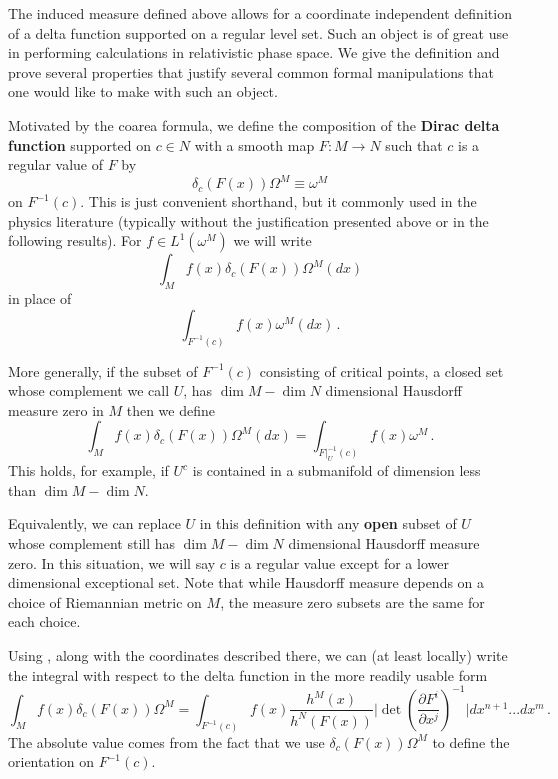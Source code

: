  The induced measure defined above allows for a coordinate independent definition of a delta function supported on a regular level set.  Such an object is of great use in performing calculations in relativistic phase space.  We give the definition and prove several properties that justify several common formal manipulations that one would like to make with such an object.
\begin{definition}
Motivated by the coarea formula, we define the composition of the {\bf Dirac delta function} supported on $c\in N$ with a smooth map $F:M\rightarrow N$ such that $c$ is a regular value of $F$ by
\begin{equation}\label{deltaDef}
 \delta_c(F(x))\Omega^M \equiv \omega^M
\end{equation}
on $F^{-1}(c)$.  This is just convenient shorthand, but it commonly used in the physics literature (typically without the justification presented above or in the following results).   For $f\in L^1(\omega^M)$ we will write 
\begin{equation}
\int_M f(x)\delta_c(F(x))\Omega^M(dx)
\end{equation} 
in place of 
\begin{equation}
\int_{F^{-1}(c)} f(x) \omega^M(dx)\,.
\end{equation}



More generally, if the subset of $F^{-1}(c)$ consisting of critical points, a closed set whose complement we call $U$, has $\dim M-\dim N$ dimensional Hausdorff measure zero in $M$ then we define
\begin{equation}
\int_M f(x)\delta_c(F(x))\Omega^M(dx)=\int_{F|_U^{-1}(c)} f(x)\omega^M\,.
\end{equation}
This holds, for example, if $U^c$ is contained in a submanifold of dimension less than  $\dim M-\dim N$.  

Equivalently, we can replace $U$ in this definition with any {\bf open} subset of $U$ whose complement still has $\dim M-\dim N$ dimensional Hausdorff measure zero. In this situation, we will say $c$ is a regular value except for a lower dimensional exceptional set.  Note that while Hausdorff measure depends on a choice of Riemannian metric on $M$, the measure zero subsets are the same for each choice.
\end{definition}

Using , along with the coordinates described there, we can (at least locally) write the integral with respect to the delta function in the more readily usable form
\begin{equation}\label{deltaIntegralCoords}
\int_M f(x)\delta_c(F(x))\Omega^M=\int_{F^{-1}(c)} f(x)\frac{h^M(x)}{h^N(F(x))}\bigg|\det \left(\frac{\partial F^i}{\partial x^j}\right)^{-1}\bigg|dx^{n+1}...dx^m\,.
\end{equation}
The absolute value comes from the fact that we use $\delta_c(F(x))\Omega^M$ to define the orientation on $F^{-1}(c)$.


